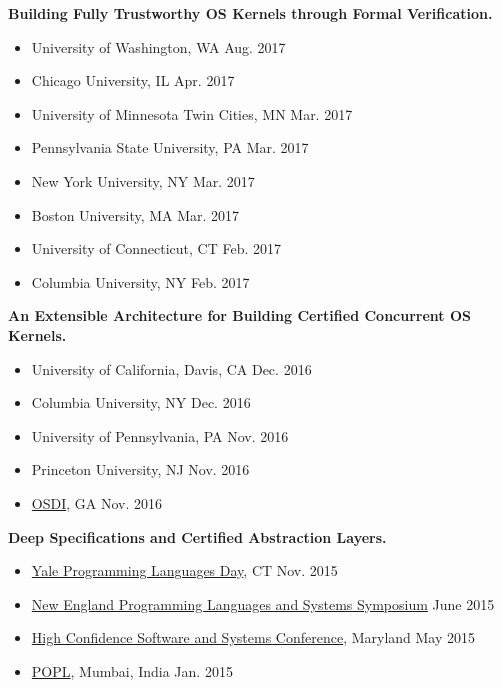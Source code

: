 \documentclass[11pt]{article}
\newenvironment{innerlist}[1][\enskip\textbullet]%
        {\begin{itemize}[#1,leftmargin=*,parsep=0pt,itemsep=2pt,topsep=2pt,partopsep=0pt]}
        {\end{itemize}}
\begin{document}
\textbf{Building Fully Trustworthy OS Kernels through Formal Verification.}
\begin{innerlist}
\item University of Washington, WA \hfill Aug. 2017
\item Chicago University, IL \hfill Apr. 2017
\item University of Minnesota Twin Cities, MN \hfill Mar. 2017
\item Pennsylvania State University, PA \hfill Mar. 2017
\item New York University, NY \hfill Mar. 2017
\item Boston University, MA \hfill Mar. 2017
\item University of Connecticut, CT \hfill Feb. 2017
\item Columbia University, NY \hfill Feb. 2017
\end{innerlist}

\vspace{.1in}


\textbf{An Extensible Architecture for Building Certified Concurrent OS Kernels.}
\begin{innerlist}
\item University of California, Davis, CA \hfill Dec. 2016
\item Columbia University, NY \hfill Dec. 2016
\item University of Pennsylvania, PA \hfill Nov. 2016
\item Princeton University, NJ \hfill Nov. 2016
\item \href{https://www.usenix.org/conference/osdi16/technical-sessions/presentation/gu}{OSDI}, GA \hfill Nov. 2016
\end{innerlist}


\vspace{.1in}

\textbf{Deep Specifications and Certified Abstraction Layers.}
\begin{innerlist}
\item \href{http://www.cs.yale.edu/homes/piskac/YalePLDay.html}
{Yale Programming Languages Day}, CT
\hfill Nov. 2015

\item \href{http://www.nepls.org/Events/27/abstracts.html#gu}
{New England Programming Languages and Systems Symposium}
\hfill June 2015

\item \href{http://cps-vo.org/node/19212}
{High Confidence Software and Systems Conference}, Maryland
\hfill May 2015

\item \href{http://popl.mpi-sws.org/2015/}
{POPL}, Mumbai, India
\hfill Jan. 2015
\end{innerlist}
\end{document}
